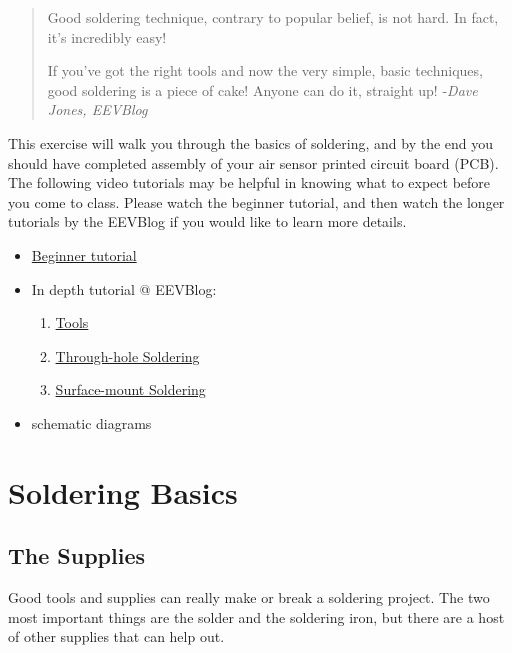 \documentclass[]{book}
\providecommand{\tightlist}{%
  \setlength{\itemsep}{0pt}\setlength{\parskip}{0pt}}
\begin{document}
\begin{quote}
Good soldering technique, contrary to popular belief, is not hard. In fact, it's incredibly easy!

If you've got the right tools and now the very simple, basic techniques, good soldering is a piece of cake! Anyone can do it, straight up!
-\emph{Dave Jones, EEVBlog}
\end{quote}

This exercise will walk you through the basics of soldering, and by the end you should have completed assembly of your air sensor printed circuit board (PCB). The following video tutorials may be helpful in knowing what to expect before you come to class. Please watch the beginner tutorial, and then watch the longer tutorials by the EEVBlog if you would like to learn more details.

\begin{itemize}
\tightlist
\item
  \href{https://www.youtube.com/watch?v=Qps9woUGkvI}{Beginner tutorial}
\item
  In depth tutorial @ EEVBlog:

  \begin{enumerate}
  \def\labelenumi{\arabic{enumi}.}
  \tightlist
  \item
    \href{https://www.youtube.com/watch?v=J5Sb21qbpEQ}{Tools}
  \item
    \href{https://www.youtube.com/watch?v=fYz5nIHH0iY}{Through-hole Soldering}
  \item
    \href{https://www.youtube.com/watch?v=b9FC9fAlfQE}{Surface-mount Soldering}
  \end{enumerate}
\item
  schematic diagrams
\end{itemize}

\hypertarget{soldering-basics}{%
\section{Soldering Basics}\label{soldering-basics}}

\hypertarget{the-supplies}{%
\subsection{The Supplies}\label{the-supplies}}

Good tools and supplies can really make or break a soldering project. The two most important things are the solder and the soldering iron, but there are a host of other supplies that can help out.
\end{document}
